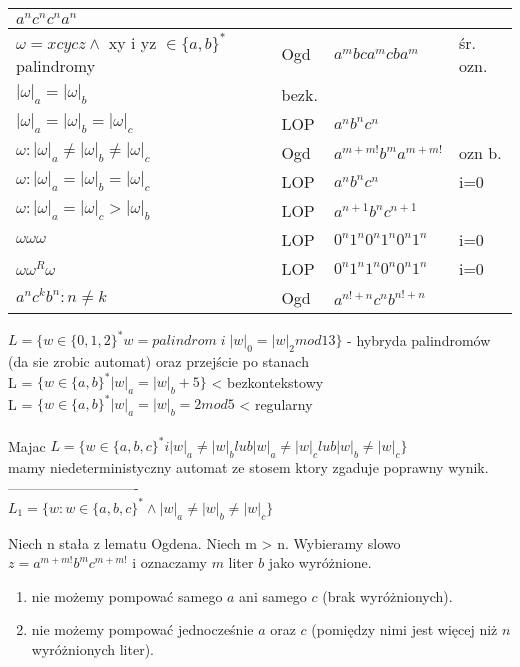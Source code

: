 \begin{tabular}{l|l|l|l}
    $a^{n}c^{n}c^{n}a^{n}$ \\
  \hline
    $\omega = xcycz \wedge$ xy i yz $\in \lbrace a,b \rbrace ^{*}$palindromy & Ogd & $a^{m}bca^{m}cba^{m}$ & śr. ozn. \\
  \hline
    $|\omega|_{a} = |\omega|_{b}$ & bezk. & \\
  \hline
    $|\omega|_{a} = |\omega|_{b}= |\omega|_{c}$ & LOP & $a^{n}b^{n}c^{n}$ & \\
  \hline
    $\omega : |\omega|_{a} \neq |\omega|_{b} \neq |\omega|_{c}$ & Ogd & $a^{m+m!}b^{m}a^{m+m!}$ & ozn b.\\
  \hline 
    $\omega : |\omega|_{a} = |\omega|_{b} = |\omega|_{c}$ & LOP & $a^{n}b^{n}c^{n}$ & i=0\\
  \hline
    $\omega : |\omega|_{a} = |\omega|_{c} > |\omega|_{b}$ & LOP & $a^{n+1}b^{n}c^{n+1}$ &\\
  \hline
    $\omega\omega\omega$ & LOP & $0^{n}1^{n}0^{n}1^{n}0^{n}1^{n}$ & i=0\\
  \hline
    $\omega\omega^{R}\omega$ & LOP & $0^{n}1^{n}1^{n}0^{n}0^{n}1^{n}$ & i=0\\
  \hline
    $a^{n}c^{k}b^{n} : n \neq k$ & Ogd & $a^{n!+n}c^{n}b^{n!+n}$& \\
\end{tabular}

$ L = \{ w \in \{0, 1, 2 \}^* w = palindrom \; i \; |w|_0 = |w|_2 mod 13\} $ - hybryda palindromów (da sie zrobic automat) oraz przejście po stanach \\
L = $ \{ w \in \{a, b \}^* |w|_a = |w|_b + 5 \} $ < bezkontekstowy \\
L = $ \{ w \in \{a, b \}^* |w|_a = |w|_b = 2 mod 5 $ < regularny \\
\\

Majac $ L = \{ w \in \{a, b, c\}^* i |w|_a \neq |w|_b lub |w|_a \neq |w|_c lub |w|_b \neq |w|_c \} $ \\
mamy niedeterministyczny automat ze stosem ktory zgaduje poprawny wynik. \\
----------------------------\\

$L_{1} = \{w: w\in\{a,b,c\}^{*} \wedge |w|_{a} \neq |w|_{b} \neq |w|_{c}\}$
 
 Niech n stała z lematu Ogdena. Niech m > n. Wybieramy slowo $z = a^{m + m!}b^{m}c^{m + m!}$ i oznaczamy $m$ liter $b$ jako wyróżnione.
 \begin{enumerate}
 	\item nie możemy pompować samego $a$ ani samego $c$ (brak wyróżnionych).
 	\item nie możemy pompować jednocześnie $a$ oraz $c$ (pomiędzy nimi jest więcej niż $n$ wyróżnionych liter).
 \end{enumerate}
 
